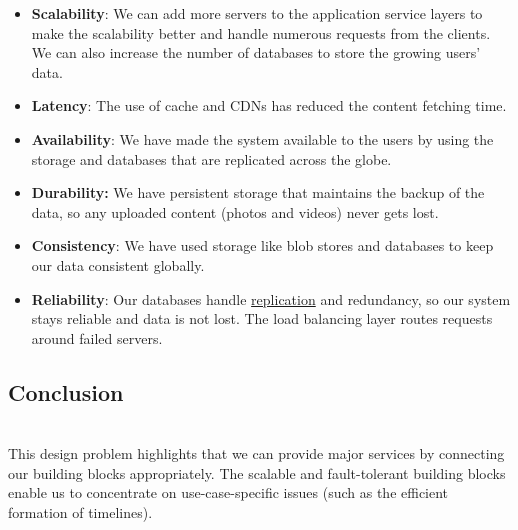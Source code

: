 \begin{itemize}
\item
\protect{}\label{iy_ft0cWCoLIkG6Wy4aue}
\textbf{Scalability}: We can add more servers to the application service layers to make the scalability better and handle numerous requests from the clients. We can also increase the number of databases to store the growing users' data.
\item
\protect{}\label{v6BqPOU2XFRtWnGYVyHYR}
\textbf{Latency}: The use of cache and CDNs has reduced the content fetching time.
\item
\protect{}\label{Ia_bHvAit5oFoIi3Ba-0C}
\textbf{Availability}: We have made the system available to the users by using the storage and databases that are replicated across the globe.
\item
\protect{}\label{VAFACd52Zi9W-RUDpYqkx}
\textbf{Durability:} We have persistent storage that maintains the backup of the data, so any uploaded content (photos and videos) never gets lost.
\item
\protect{}\label{F7w4q43Le4SuFbY8iFVTZ}
\textbf{Consistency}: We have used storage like blob stores and databases to keep our data consistent globally.
\item
\protect{}\label{NISC7rh16wiZwG73deARR}
\textbf{Reliability}: Our databases handle \href{https://www.educative.io/courses/grokking-the-system-design-interview/data-replication}{replication} and redundancy, so our system stays reliable and data is not lost. The load balancing layer routes requests around failed servers.
\end{itemize}

\subsection{Conclusion}\label{J2GKQbaIkAYXwZLqrVomR}
\\
This design problem highlights that we can provide major services by connecting our building blocks appropriately. The scalable and fault-tolerant building blocks enable us to concentrate on use-case-specific issues (such as the efficient formation of timelines).


